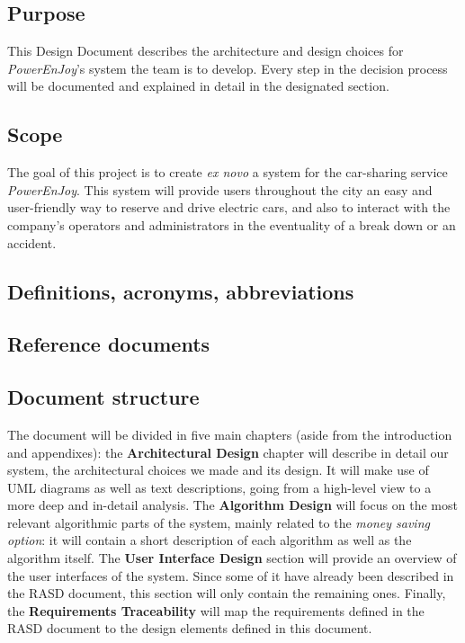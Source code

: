 \subsection{Purpose}
This Design Document describes the architecture and design choices for \textit{PowerEnJoy}'s system the team is to develop. Every step in the decision process will be documented and explained in detail in the designated section.

\subsection{Scope}
The goal of this project is to create \textit{ex novo} a system for the car-sharing service \textit{PowerEnJoy}. This system will provide users throughout the city an easy and user-friendly way to reserve and drive electric cars, and also to interact with the company's operators and administrators in the eventuality of a break down or an accident.

\subsection{Definitions, acronyms, abbreviations}

\subsection{Reference documents}

\subsection{Document structure}
The document will be divided in five main chapters (aside from the introduction and appendixes): the \textbf{Architectural Design} chapter will describe in detail our system, the architectural choices we made and its design. It will make use of UML diagrams as well as text descriptions, going from a high-level view to a more deep and in-detail analysis. The \textbf{Algorithm Design} will focus on the most relevant algorithmic parts of the system, mainly related to the \textit{money saving option}: it will contain a short description of each algorithm as well as the algorithm itself. 
The \textbf{User Interface Design} section will provide an overview of the user interfaces of the system. Since some of it have already been described in the RASD document, this section will only contain the remaining ones. 
Finally, the \textbf{Requirements Traceability} will map the requirements defined in the RASD document to the design elements defined in this document.